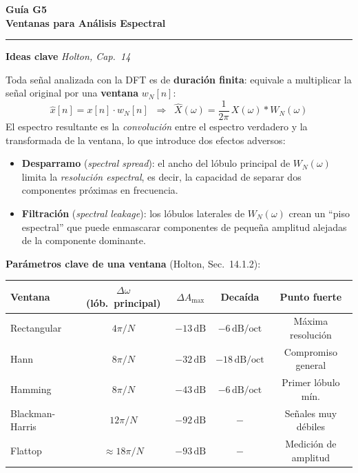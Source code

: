 \documentclass[11pt, a4paper]{article}
\begin{document}
\begin{center}
  {\LARGE\bfseries\color{unsam} Gu\'ia G5}\\[0.25cm]
  {\large\bfseries Ventanas para An\'alisis Espectral}\\[0.15cm]
  {\color{unsam}\rule{0.6\linewidth}{1.2pt}}
\end{center}
\vspace{0.3cm}

\begin{conceptbox}
\textbf{Ideas clave} \hfill \small\textit{Holton, Cap.~14}
\medskip

Toda se\~nal analizada con la DFT es de \textbf{duraci\'on finita}: equivale a multiplicar
la se\~nal original por una \textbf{ventana} $w_N[n]$:
$$\hat{x}[n] = x[n]\cdot w_N[n]
\;\;\Longrightarrow\;\;
\hat{X}(\omega) = \frac{1}{2\pi}\,X(\omega) * W_N(\omega)$$
El espectro resultante es la \emph{convoluci\'on} entre el espectro verdadero y la
transformada de la ventana, lo que introduce dos efectos adversos:

\begin{itemize}[noitemsep]
  \item \textbf{Desparramo} (\textit{spectral spread}): el ancho del l\'obulo principal de
    $W_N(\omega)$ limita la \emph{resoluci\'on espectral}, es decir, la capacidad de separar
    dos componentes pr\'oximas en frecuencia.
  \item \textbf{Filtraci\'on} (\textit{spectral leakage}): los l\'obulos laterales de
    $W_N(\omega)$ crean un ``piso espectral'' que puede enmascarar componentes de peque\~na
    amplitud alejadas de la componente dominante.
\end{itemize}

\smallskip
\textbf{Par\'ametros clave de una ventana} (Holton, Sec.~14.1.2):

\smallskip
\begin{center}
\begin{tabular}{lcccc}
\toprule
\textbf{Ventana} & $\Delta\omega$ (l\'ob.\ principal) & $\Delta A_{\max}$ & Decaída & Punto fuerte \\
\midrule
Rectangular        & $4\pi/N$   & $-13\,\text{dB}$ & $-6\,\text{dB/oct}$  & Máxima resolución \\
Hann               & $8\pi/N$   & $-32\,\text{dB}$ & $-18\,\text{dB/oct}$ & Compromiso general \\
Hamming            & $8\pi/N$   & $-43\,\text{dB}$ & $-6\,\text{dB/oct}$  & Primer lóbulo mín. \\
Blackman-Harris    & $12\pi/N$  & $-92\,\text{dB}$ & $-$                  & Señales muy débiles \\
Flattop            & $\approx18\pi/N$ & $-93\,\text{dB}$ & $-$ & Medición de amplitud \\
\bottomrule
\end{tabular}
\end{center}
\end{conceptbox}
\end{document}
